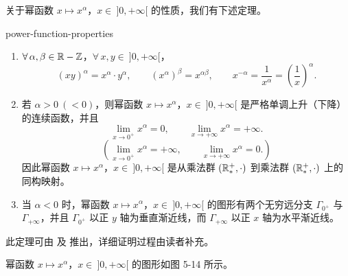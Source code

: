 关于幂函数 \(x\longmapsto x^\alpha\)，\(x\in\ ]0,+\infty[\) 的性质，我们有下述定理。

\begin{mythm}{}{power-function-properties}

	\begin{enumerate}[label=\arabic*)]
		\item \(\forall\,\alpha,\beta\in\mathbb{R}-\mathbb{Z}\)，\(\forall\,x,y\in\ ]0,+\infty[\)，
		\[
		(xy)^\alpha=x^\alpha\cdot y^\alpha,\qquad(x^\alpha)^\beta=x^{\alpha\beta},\qquad x^{-\alpha}=\frac1{x^\alpha}=\left(\frac1x\right)^\alpha.
		\]

		\item 若 \(\alpha>0\ (<0)\)，则幂函数 \(x\longmapsto x^\alpha\)，\(x\in\ ]0,+\infty[\) 是严格单调上升（下降）的连续函数，并且
		\[
		\lim_{x\to0^+}x^\alpha=0,\qquad\lim_{x\to+\infty}x^\alpha=+\infty.
		\]
		\[
		\left(\lim_{x\to0^+}x^\alpha=+\infty,\qquad\lim_{x\to+\infty}x^\alpha=0.\right)
		\]
		因此幂函数 \(x\longmapsto x^\alpha\)，\(x\in\ ]0,+\infty[\) 是从乘法群 \((\mathbb{R}_*^+,\cdot)\) 到乘法群 \((\mathbb{R}_*^+,\cdot)\) 上的同构映射。

		\item 当 \(\alpha<0\) 时，幂函数 \(x\longmapsto x^\alpha\)，\(x\in\ ]0,+\infty[\) 的图形有两个无穷远分支 \(\Gamma_{0^+}\) 与 \(\Gamma_{+\infty}\)，并且 \(\Gamma_{0^+}\) 以正 \(y\) 轴为垂直渐近线，而 \(\Gamma_{+\infty}\) 以正 \(x\) 轴为水平渐近线。
	\end{enumerate}

\end{mythm}

此定理可由 及 推出，详细证明过程由读者补充。

幂函数 \(x\longmapsto x^\alpha\)，\(x\in\ ]0,+\infty[\) 的图形如图 5-14 所示。

